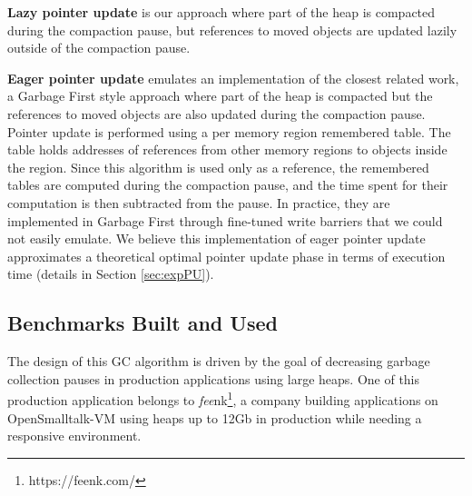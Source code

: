 \documentclass[sigplan,10pt,review,anonymous]{acmart}\settopmatter{printfolios=true,printccs=false,printacmref=false}
\def\feenk{\textit{fee}\textsf{nk}\xspace}
\def\OpenSmalltalkVM{OpenSmalltalk-VM\xspace}
\def\ie{\emph{i.e., }}
\begin{document}
\textbf{Lazy pointer update} is our approach where part of the heap is compacted during the compaction pause, but references to moved objects are updated lazily outside of the compaction pause. 

\textbf{Eager pointer update} emulates an implementation of the closest related work, a Garbage First style approach where part of the heap is compacted but the references to moved objects are also updated during the compaction pause. Pointer update is performed using a per memory region remembered table. The table holds addresses of references from other memory regions to objects inside the region. Since this algorithm is used only as a reference, the remembered tables are computed during the compaction pause, and the time spent for their computation is then subtracted from the pause. In practice, they are implemented in Garbage First through fine-tuned write barriers that we could not easily emulate. We believe this implementation of eager pointer update approximates a theoretical optimal pointer update phase in terms of execution time (details in Section \ref{sec:expPU}).%


\subsection{Benchmarks Built and Used}
The design of this GC algorithm is driven by the goal of decreasing garbage collection pauses in production applications using large heaps. One of this production application belongs to \feenk\footnote{https://feenk.com/}, a company building applications on \OpenSmalltalkVM using heaps up to 12Gb in production while needing a responsive environment. 
\end{document}
